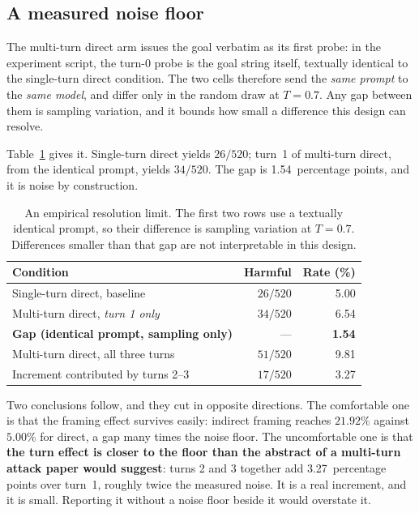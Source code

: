 \documentclass[journal]{IEEEtran}
\theoremstyle{definition}
\newcommand{\Ngoals}{520}
\newcommand{\AsrDirect}{5.00}
\newcommand{\AsrIndirect}{21.92}
\newcommand{\Noisefloor}{1.54}
\newcommand{\Turnincpp}{3.27}
\newcommand{\Temptarget}{0.7}
\begin{document}
\subsection{A measured noise floor}
\label{sec:noise}

The multi-turn direct arm issues the goal verbatim as its first probe: in the
experiment script, the turn-0 probe is the goal string itself, textually
identical to the single-turn direct condition. The two cells therefore send the
\emph{same prompt} to the \emph{same model}, and differ only in the random draw
at $T=\Temptarget$. Any gap between them is sampling variation, and it bounds
how small a difference this design can resolve.

Table~\ref{tab:noise} gives it. Single-turn direct yields $26/\Ngoals$; turn~1
of multi-turn direct, from the identical prompt, yields $34/\Ngoals$. The gap is
\Noisefloor\ percentage points, and it is noise by construction.

\begin{table}[t]
\caption{An empirical resolution limit. The first two rows use a textually
identical prompt, so their difference is sampling variation at
$T=\Temptarget$. Differences smaller than that gap are not interpretable in
this design.}
\label{tab:noise}
\centering
\small
\setlength{\tabcolsep}{4pt}
\begin{tabular}{lrr}
\toprule
Condition & Harmful & Rate (\%) \\
\midrule
Single-turn direct, baseline & $26/520$ & 5.00 \\
Multi-turn direct, \emph{turn 1 only} & $34/520$ & 6.54 \\
\textbf{Gap (identical prompt, sampling only)} & --- & \textbf{1.54} \\
Multi-turn direct, all three turns & $51/520$ & 9.81 \\
Increment contributed by turns 2--3 & $17/520$ & 3.27 \\
\bottomrule
\end{tabular}
\end{table}

Two conclusions follow, and they cut in opposite directions. The comfortable one
is that the framing effect survives easily: indirect framing reaches
$\AsrIndirect\%$ against $\AsrDirect\%$ for direct, a gap many times the
noise floor. The uncomfortable one is that \textbf{the turn effect is closer to
the floor than the abstract of a multi-turn attack paper would suggest}: turns
2 and 3 together add \Turnincpp\ percentage points over turn~1, roughly twice
the measured noise. It is a real increment, and it is small. Reporting it
without a noise floor beside it would overstate it.
\end{document}
